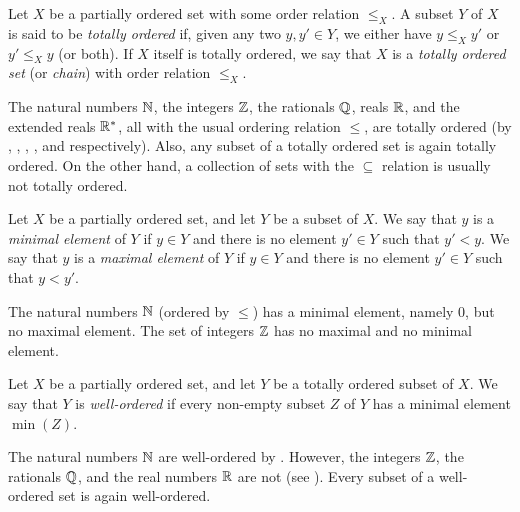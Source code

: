 \begin{defn}\label{i:8.5.3}
  Let \(X\) be a partially ordered set with some order relation \(\leq_X\).
  A subset \(Y\) of \(X\) is said to be \emph{totally ordered} if, given any two \(y, y' \in Y\), we either have \(y \leq_X y'\) or \(y' \leq_X y\) (or both).
  If \(X\) itself is totally ordered, we say that \(X\) is a \emph{totally ordered set} (or \emph{chain}) with order relation \(\leq_X\).
\end{defn}

\begin{eg}\label{i:8.5.4}
  The natural numbers \(\mathbb{N}\), the integers \(\mathbb{Z}\), the rationals \(\mathbb{Q}\), reals \(\mathbb{R}\), and the extended reals \(\mathbb{R}^*\), all with the usual ordering relation \(\leq\), are totally ordered
  (by , , , , and  respectively).
  Also, any subset of a totally ordered set is again totally ordered. On the other hand, a collection of sets with the \(\subseteq\) relation is usually not totally ordered.
\end{eg}

\begin{defn}\label{i:8.5.5}
  Let \(X\) be a partially ordered set, and let \(Y\) be a subset of \(X\).
  We say that \(y\) is a \emph{minimal element} of \(Y\) if \(y \in Y\) and there is no element \(y' \in Y\) such that \(y' < y\).
  We say that \(y\) is a \emph{maximal element} of \(Y\) if \(y \in Y\) and there is no element \(y' \in Y\) such that \(y < y'\).
\end{defn}

\setcounter{thm}{6}
\begin{eg}\label{i:8.5.7}
  The natural numbers \(\mathbb{N}\) (ordered by \(\leq\)) has a minimal element, namely \(0\), but no maximal element.
  The set of integers \(\mathbb{Z}\) has no maximal and no minimal element.
\end{eg}

\begin{defn}\label{i:8.5.8}
  Let \(X\) be a partially ordered set, and let \(Y\) be a totally ordered subset of \(X\).
  We say that \(Y\) is \emph{well-ordered} if every non-empty subset \(Z\) of \(Y\) has a minimal element \(\min(Z)\).
\end{defn}

\begin{eg}\label{i:8.5.9}
  The natural numbers \(\mathbb{N}\) are well-ordered by .
  However, the integers \(\mathbb{Z}\), the rationals \(\mathbb{Q}\), and the real numbers \(\mathbb{R}\) are not (see ).
  Every subset of a well-ordered set is again well-ordered.
\end{eg}


